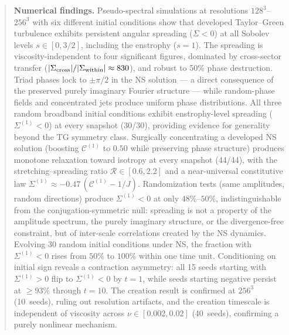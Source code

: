\documentclass[11pt]{article}
\theoremstyle{definition}
\newcommand{\cC}{\mathcal{C}}
\begin{document}
\begin{abstract}
\smallskip\noindent\textbf{Numerical findings.}
Pseudo-spectral simulations at resolutions $128^3$--$256^3$
with six different initial conditions show that developed
Taylor--Green turbulence exhibits persistent angular
spreading ($\Sigma < 0$) at all Sobolev levels
$s\in[0,3/2]$, including the enstrophy ($s=1$).
The spreading is viscosity-independent to four significant
figures, dominated by cross-sector transfer
($|\Sigma_{\rm cross}|/|\Sigma_{\rm within}|\approx 830$),
and robust to 50\% phase destruction.
Triad phases lock to $\pm\pi/2$ in the NS solution ---
a direct consequence of the preserved purely imaginary
Fourier structure --- while random-phase fields and
concentrated jets produce uniform phase distributions.
All three random broadband initial conditions exhibit
enstrophy-level spreading ($\Sigma^{(1)}<0$) at every
snapshot (30/30), providing evidence for generality
beyond the TG symmetry class.
Surgically concentrating a developed NS solution
(boosting $\cC^{(1)}$ to $0.50$ while preserving
phase structure) produces monotone relaxation toward
isotropy at every snapshot (44/44), with the
stretching--spreading ratio $\mathcal{R}\in[0.6,2.2]$
and a near-universal constitutive law
$\Sigma^{(1)}\approx -0.47\,(\cC^{(1)}-1/J)$.
Randomization tests (same amplitudes, random
directions) produce $\Sigma^{(1)}<0$ at only
$48\%$--$50\%$, indistinguishable from the
conjugation-symmetric null: spreading is not a
property of the amplitude spectrum, the purely
imaginary structure, or the divergence-free
constraint, but of inter-scale correlations
created by the NS dynamics.
Evolving 30 random initial conditions under NS,
the fraction with $\Sigma^{(1)}<0$ rises from
$50\%$ to $100\%$ within one time unit.
Conditioning on initial sign reveals a contraction
asymmetry: all 15 seeds starting with $\Sigma^{(1)}>0$
flip to $\Sigma^{(1)}<0$ by $t=1$, while seeds
starting negative persist at $\geq 93\%$ through
$t=10$.  The creation result is confirmed at
$256^3$ (10~seeds), ruling out resolution artifacts,
and the creation timescale is independent of
viscosity across $\nu\in[0.002,0.02]$ (40~seeds),
confirming a purely nonlinear mechanism.


\end{abstract}
\end{document}
